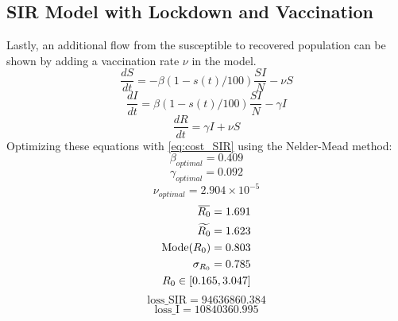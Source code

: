 \documentclass[tikz,fleqn,12pt]{wlscirep}
\newcommand{\overbar}[1]{\mkern 1.5mu\overline{\mkern-1.5mu#1\mkern-1.5mu}\mkern 1.5mu}
\begin{document}
\subsection{SIR Model with Lockdown and Vaccination}
Lastly, an additional flow from the susceptible to recovered population can be shown by adding a vaccination rate $\nu$ in the model. 
\begin{equation}
  \frac{dS}{dt} = -\beta (1 - s(t)/100) \frac{S I}{N} - \nu S
  \label{eq:S_with_lockdown_and_nu}
\end{equation}
\begin{equation}
  \frac{dI}{dt} = \beta (1 - s(t)/100) \frac{S I}{N} - \gamma I
  \label{eq:I_with_lockdown_and_nu}
\end{equation}
\begin{equation}
  \frac{dR}{dt} = \gamma I + \nu S
  \label{eq:R_with_lockdown_and_nu}
\end{equation}
Optimizing these equations with \cref{eq:cost_SIR} using the Nelder-Mead method:
\begin{equation}
  \beta_{optimal} = 0.409
  \label{eq:beta_optimal_with_lockdown_and_nu}
\end{equation}
\begin{equation}
  \gamma_{optimal} = 0.092
  \label{eq:gamma_optimal_with_lockdown_and_nu}
\end{equation}
\begin{equation}
  \nu_{optimal} = 2.904 \times 10^{-5}
  \label{eq:nu_optimal_with_lockdown_and_nu}
\end{equation}
\begin{equation}
  \begin{split}
    \overbar{R_0} = 1.691 \\
    \widetilde{R_0} = 1.623 \\
    \text{Mode}(R_0) = 0.803 \\
    \sigma_{R_0} = 0.785 \\
    R_0 \in [0.165, 3.047]
  \end{split}
  \label{eq:r0_with_lockdown_and_nu}
\end{equation}
\begin{equation}
  \textrm{loss\_SIR} = 94636860.384
  \label{eq:cost_SIR_with_lockdown_and_nu}
\end{equation}
\begin{equation}
  \textrm{loss\_I} = 10840360.995
  \label{eq:cost_I_with_lockdown_and_nu}
\end{equation}
\end{document}
